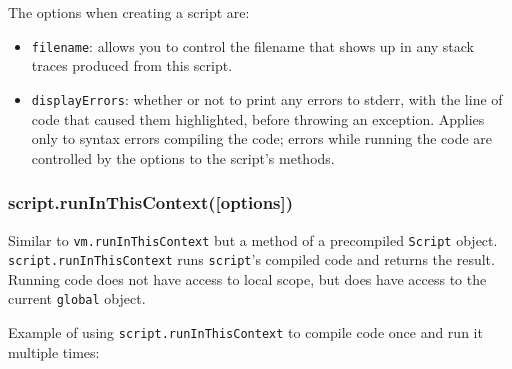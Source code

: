 The options when creating a script are:

\begin{itemize}
\item
  \texttt{filename}: allows you to control the filename that shows up in
  any stack traces produced from this script.
\item
  \texttt{displayErrors}: whether or not to print any errors to stderr,
  with the line of code that caused them highlighted, before throwing an
  exception. Applies only to syntax errors compiling the code; errors
  while running the code are controlled by the options to the script's
  methods.
\end{itemize}

\subsubsection{script.runInThisContext({[}options{]})}

Similar to \texttt{vm.runInThisContext} but a method of a precompiled
\texttt{Script} object. \texttt{script.runInThisContext} runs
\texttt{script}'s compiled code and returns the result. Running code
does not have access to local scope, but does have access to the current
\texttt{global} object.

Example of using \texttt{script.runInThisContext} to compile code once
and run it multiple times:

\begin{Shaded}
\begin{Highlighting}[]
 \NormalTok{);}

 \NormalTok{= }\NormalTok{;}

  \NormalTok{(}\NormalTok{, \{ }\NormalTok{: } \NormalTok{\});}

 \NormalTok{(} 
  \NormalTok{();}
\NormalTok{\}}


\end{Highlighting}
\end{Shaded}

